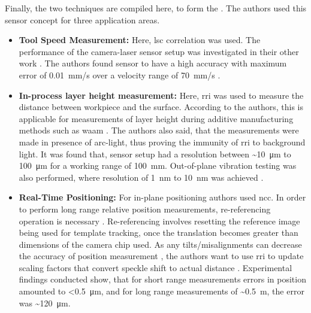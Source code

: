         \vspace{5mm}
        \noindent Finally, the two techniques are compiled here, to form the . The authors used this sensor concept for three application areas.
        
        \begin{itemize}

            \item \textbf{Tool Speed Measurement:} Here, \gls{lsc} correlation was used. The performance of the camera-laser sensor setup was investigated in their other work \cite{charrett_2018}. The authors found sensor to have a high accuracy with maximum error of \pm\SI{0.01}{\milli\meter/\second} over a velocity range of \pm\SI{70}{\milli\meter/\second} \cite{charrett_wpos}.
            
            \item \textbf{In-process layer height measurement:} Here, \gls{rri} was used to measure the distance between workpiece and the surface. According to the authors, this is applicable for measurements of layer height during additive manufacturing methods such as \gls{waam} \cite{hallam_waam}. The authors also said, that the measurements were made in presence of arc-light, thus proving the immunity of \gls{rri} to background light. It was found that, sensor setup had a resolution between \sim \SI{10}{\micro\meter} to \SI{100}{\micro\meter} for a working range of \SI{100}{\milli\meter}. Out-of-plane vibration testing was also performed, where resolution of \SI{1}{\nano\meter} to \SI{10}{\nano\meter} was achieved \cite{charrett_wpos}. 

            \item \textbf{Real-Time Positioning:} For in-plane positioning authors used \gls{ncc}. In order to perform long range relative position measurements, re-referencing operation is necessary \cite{charrett_wpos}. Re-referencing involves resetting the reference image being used for template tracking, once the translation becomes greater than dimensions of the camera chip used. As any tilts/misalignments can decrease the accuracy of position measurement \cite{charrett_2018}, the authors want to use \gls{rri} to update scaling factors that convert speckle shift to actual distance \cite{charrett_wpos}. Experimental findings conducted show, that for short range measurements errors in position amounted to \textless\SI{0.5}{\micro\meter}, and for long range measurements of \sim \SI{0.5}{\meter}, the error was \sim\SI{120}{\micro\meter}.

        \end{itemize}
            
